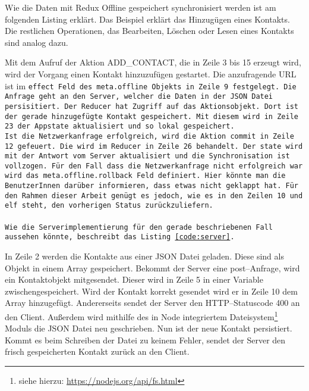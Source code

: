 Wie die Daten mit Redux Offline gespeichert synchronisiert werden ist am folgenden Listing erklärt. Das Beispiel erklärt das Hinzugügen eines Kontakts. Die restlichen Operationen, das Bearbeiten, Löschen oder Lesen eines Kontakts sind analog dazu. 
\begin{center}  
\end{center}
%
Mit dem Aufruf der Aktion ADD\_CONTACT, die in Zeile 3 bis 15 erzeugt wird, wird der Vorgang einen Kontakt hinzuzufügen gestartet.
Die anzufragende URL ist im \tt{effect} Feld des \tt{meta.offline} Objekts in Zeile 9 festgelegt. Die Anfrage geht an den Server, welcher die Daten in der \gls{JSON} Datei persisitiert.
Der Reducer hat Zugriff auf das Aktionsobjekt. Dort ist der gerade hinzugefügte Kontakt gespeichert. Mit diesem wird in Zeile 23 der Appstate aktualisiert und so lokal gespeichert.\\
Ist die Netzwerkanfrage erfolgreich, wird die Aktion \tt{commit} in Zeile 12 gefeuert.
Die wird im Reducer in Zeile 26 behandelt. Der \tt{state} wird mit der Antwort vom Server aktualisiert und die Synchronisation ist vollzogen.
Für den Fall dass die Netzwerkanfrage nicht erfolgreich war wird das \tt{meta.offline.rollback} Feld definiert.
Hier könnte man die BenutzerInnen darüber informieren, dass etwas nicht geklappt hat. Für den Rahmen dieser Arbeit genügt es jedoch, wie es in den Zeilen 10 und elf steht, den vorherigen Status zurückzuliefern.\\\\
Wie die Serverimplementierung für den gerade beschriebenen Fall aussehen könnte, beschreibt das Listing \ref{code:server}.
%
\begin{center}  
\end{center}
%
In Zeile 2 werden die Kontakte aus einer \gls{JSON} Datei geladen. Diese sind als Objekt in einem Array gespeichert. Bekommt der Server eine post--Anfrage, wird ein Kontaktobjekt mitgesendet. Dieser wird in Zeile 5 in einer Variable zwischengespeichert. 
Wird der Kontakt korrekt gesendet wird er in Zeile 10 dem Array hinzugefügt. Andererseits sendet der Server den \gls{HTTP}--Statuscode 400 an den Client. %
Außerdem wird mithilfe des in Node integriertem Dateisystem\footnote{siehe hierzu: \url{https://nodejs.org/api/fs.html}} Moduls die \gls{JSON} Datei neu geschrieben. Nun ist der neue Kontakt persistiert. Kommt es beim Schreiben der Datei zu keinem Fehler, sendet der Server den frisch gespeicherten Kontakt zurück an den Client.